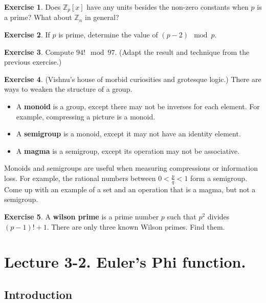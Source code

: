 \documentclass[11pt]{article}
\theoremstyle{definition}
\newtheorem{exercise}{Exercise}
\numberwithin{thm}{section}
\begin{document}
\begin{exercise} Does $\mathbb{Z}_p [x]$ have any units besides the non-zero constants when $p$ is a prime? What about $\mathbb{Z}_n$ in general?
\end{exercise}

\begin{exercise} If $p$ is prime, determine the value of $(p-2) \mod p$.
\end{exercise}

\begin{exercise} Compute $94! \mod 97$. (Adapt the result and technique from the previous exercise.)
\end{exercise}

\begin{exercise} (Vishnu's house of morbid curiosities and grotesque logic.) There are ways to weaken the structure of a group.
\begin{itemize}
	\item A \textbf{monoid} is a group, except there may not be inverses for each element. For example, compressing a picture is a monoid.
	\item A \textbf{semigroup} is a monoid, except it may not have an identity element.
    \item A \textbf{magma} is a semigroup, except its operation may not be associative. 
\end{itemize}

Monoids and semigroups are useful when measuring compressions or information loss. For example, the rational numbers between $0 < \frac{p}{q} < 1$ form a semigroup. Come up with an example of a set and an operation that is a magma, but not a semigroup.
\end{exercise}

\begin{exercise} A \textbf{wilson prime} is a prime number $p$ such that $p^2$ divides $(p-1)! + 1$. There are only three known Wilson primes. Find them.
\end{exercise}


\newpage
\section{Lecture 3-2. Euler's Phi function.}


\subsection{Introduction}
\end{document}
